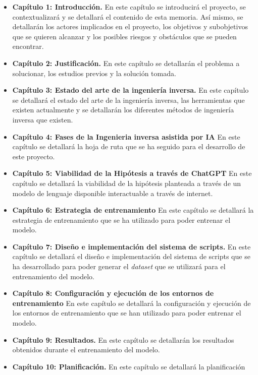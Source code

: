 \begin{itemize}
    \item \textbf{Capítulo 1: Introducción.} En este capítulo se introducirá el proyecto,
        se contextualizará y se detallará el contenido de esta memoria. Así mismo, se
        detallarán los actores implicados en el proyecto, los objetivos y subobjetivos
        que se quieren alcanzar y los posibles riesgos y obstáculos que se pueden encontrar.
    \item \textbf{Capítulo 2: Justificación.} En este capítulo se detallarán el problema
        a solucionar, los estudios previos y la solución tomada.
    \item \textbf{Capítulo 3: Estado del arte de la ingeniería inversa.} En este capítulo
        se detallará el estado del arte de la ingeniería inversa, las herramientas que
        existen actualmente y se detallarán los diferentes métodos de ingeniería inversa 
        que existen.
    \item \textbf{Capítulo 4: Fases de la Ingenieria inversa asistida por IA} En este
        capítulo se detallará la hoja de ruta que se ha seguido para el desarrollo de este
        proyecto.
    \item \textbf{Capítulo 5: Viabilidad de la Hipótesis a través de ChatGPT} En este capítulo
        se detallará la viabilidad de la hipótesis planteada a través de un modelo de lenguaje
        disponible interactuable a través de internet.
    \item \textbf{Capítulo 6: Estrategia de entrenamiento} En este capítulo se detallará
    la estrategia de entrenamiento que se ha utilizado para poder entrenar el modelo.
    \item \textbf{Capítulo 7: Diseño e implementación del sistema de scripts.} En este
        capítulo se detallará el diseño e implementación del sistema de scripts que se
        ha desarrollado para poder generar el \textit{dataset} que se utilizará para el
        entrenamiento del modelo.
    \item \textbf{Capítulo 8: Configuración y ejecución de los entornos de entrenamiento} En
        este capítulo se detallará la configuración y ejecución de los entornos de entrenamiento
        que se han utilizado para poder entrenar el modelo.
    \item \textbf{Capítulo 9: Resultados.} En este capítulo se detallarán los resultados
        obtenidos durante el entrenamiento del modelo.
    \item \textbf{Capítulo 10: Planificación.} En este capítulo se detallará la planificación

\end{itemize}

